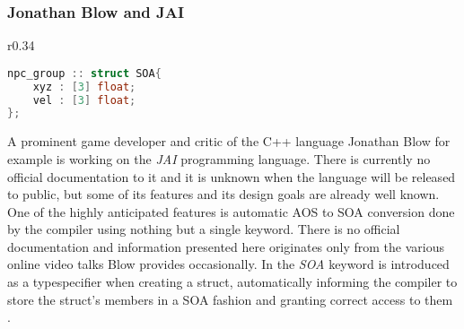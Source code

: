 \subsubsection{Jonathan Blow and JAI}
\begin{wrapfigure}[6]{r}{0.34\textwidth}
\vspace{-0.8cm}
\begin{lstlisting}[language=C++,name={JAI's native SOA support},morekeywords={SOA}, label={jai_npc}]
npc_group :: struct SOA{
	xyz : [3] float;
	vel : [3] float;
};
\end{lstlisting}
\end{wrapfigure}
A prominent game developer and critic of the C++ language Jonathan Blow for example is working on the \textit{JAI} programming language. There is currently no official documentation to it and it is unknown when the language will be released to public, but some of its features and its design goals are already well known. One of the highly anticipated features is automatic AOS to SOA conversion done by the compiler using nothing but a single keyword. There is no official documentation and information presented here originates only from the various online video talks Blow provides occasionally. In  the \textit{SOA} keyword is introduced as a typespecifier when creating a struct, automatically informing the compiler to store the struct's members in a SOA fashion and granting correct access to them .

